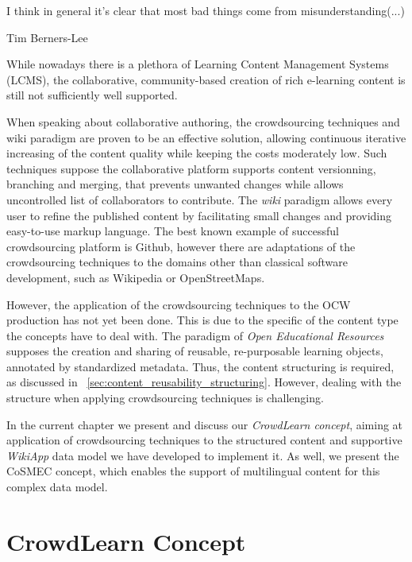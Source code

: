 \documentclass[ngerman,UKenglish,table]{scrbook}
\begin{document}
\epigraph{I think in general it's clear that most bad things come from misunderstanding(...)}{Tim Berners-Lee}

While nowadays there is a plethora of Learning Content Management Systems (LCMS), the collaborative, community-based creation of rich e-learning content is still not sufficiently well supported.

When speaking about collaborative authoring, the crowdsourcing techniques and wiki paradigm are proven to be an effective solution, allowing continuous iterative increasing of the content quality while keeping the costs moderately low.
Such techniques suppose the collaborative platform supports content versionning, branching and merging, that prevents unwanted changes while allows uncontrolled list of collaborators to contribute.
The \emph{wiki} paradigm allows every user to refine the published content by facilitating small changes and providing easy-to-use markup language.
The best known example of successful crowdsourcing platform is Github, however there are adaptations of the crowdsourcing techniques to the domains other than classical software development, such as Wikipedia or OpenStreetMaps.

However, the application of the crowdsourcing techniques to the OCW production has not yet been done.
This is due to the specific of the content type the concepts have to deal with.
The paradigm of \emph{Open Educational Resources} supposes the creation and sharing of reusable, re-purposable learning objects, annotated by standardized metadata.
Thus, the content structuring is required, as discussed in ~\autoref{sec:content_reusability_structuring}.
However, dealing with the structure when applying crowdsourcing techniques is challenging.

In the current chapter we present and discuss our \emph{CrowdLearn concept}, aiming at application of crowdsourcing techniques to the structured content and supportive \emph{WikiApp} data model we have developed to implement it.
As well, we present the CoSMEC concept, which enables the support of multilingual content for this complex data model.


\section{CrowdLearn Concept}
\label{sec:Crowdlearn}
\end{document}
